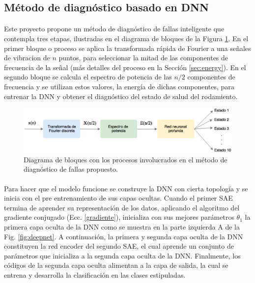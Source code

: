 \documentclass[a4paper,12pt]{article}
\begin{document}
\subsection{Método de diagnóstico basado en DNN}
\label{sec:training}
\paragraph{}
Este proyecto propone un método de diagnóstico de fallas inteligente que contempla tres etapas, ilustradas en el diagrama de bloques de la Figura \ref{fig:block}. En el primer bloque o proceso se aplica la transformada rápida de Fourier a una señales de vibracion de $n$ puntos, para seleccionar la mitad de las componentes de frecuencia de la señal (más detalles del proceso en la Sección \ref{sec:energy}). En el segundo bloque se calcula el espectro de potencia de las $n/2$ componentes de frecuencia y se utilizan estos valores, la energía de dichas componentes, para entrenar la DNN y obtener el diagnóstico del estado de salud del rodamiento.

\begin{figure}[ht]
  \centering
    \includegraphics[scale=0.7]{./modelo.eps}
  \caption{Diagrama de bloques con los procesos involucrados en el método de diagnóstico de fallas propuesto.}
  \label{fig:block}
\end{figure}

\paragraph{}
Para hacer que el modelo funcione se construye la DNN con cierta topología y se inicia con el pre entrenamiento de sus capas ocultas. Cuando el primer SAE termina de aprender su representación de los datos, aplicando el algoritmo del gradiente conjugado (Ecc. \ref{gradiente}), inicializa con sus mejores parámetros $\theta_{1}$ la primera capa oculta de la DNN como se muestra en la parte izquierda A de la Fig. \ref{fig:deepnet}. A continuación, la primera y segunda capa oculta de la DNN constituyen la red encoder del segundo SAE, el cual aprende un conjunto de parámetros que inicializa a la segunda capa oculta de la DNN. Finalmente, los códigos de la segunda capa oculta alimentan a la capa de salida, la cual se entrena y desarrolla la clasificación en las clases estipuladas.
\end{document}
